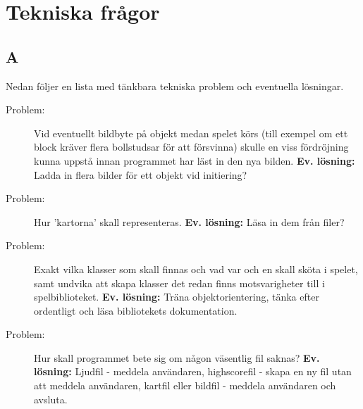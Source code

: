 \documentclass[11pt,a4paper]{article}
\begin{document}
\section{Tekniska frågor}

\subsection{A}
Nedan följer en lista med tänkbara tekniska problem och eventuella lösningar.
\begin{description}
	\item[Problem:] Vid eventuellt bildbyte på objekt medan spelet körs (till exempel om ett block kräver flera bollstudsar för att försvinna) skulle en viss fördröjning kunna uppstå innan programmet har läst in den nya bilden. \textbf{Ev. lösning:} Ladda in flera bilder för ett objekt vid initiering?
	\item[Problem:] Hur 'kartorna' skall representeras. \textbf{Ev. lösning:} Läsa in dem från filer?
	\item[Problem:] Exakt vilka klasser som skall finnas och vad var och en skall sköta i spelet, samt undvika att skapa klasser det redan finns motsvarigheter till i spelbiblioteket. \textbf{Ev. lösning:} Träna objektorientering, tänka efter ordentligt och läsa bibliotekets dokumentation.
	\item[Problem:] Hur skall programmet bete sig om någon väsentlig fil saknas? \textbf{Ev. lösning:} Ljudfil - meddela användaren, highscorefil - skapa en ny fil utan att meddela användaren, kartfil eller bildfil - meddela användaren och avsluta.
\end{description}
\end{document}
